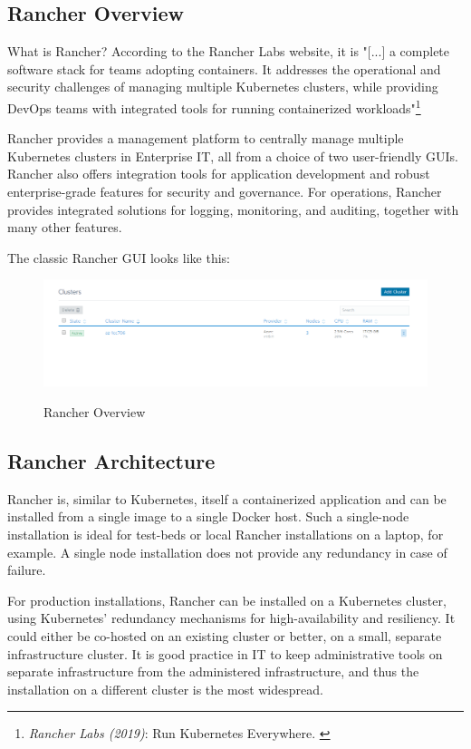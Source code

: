 \subsection{Rancher Overview}

What is Rancher? According to the Rancher Labs website, it is "[...] a complete software stack for teams adopting containers. It addresses the operational and security challenges of managing multiple Kubernetes clusters, while providing DevOps teams with integrated tools for running containerized workloads"\footnote{\textit{Rancher Labs (2019)}: Run Kubernetes Everywhere. \cite{rancher}}

Rancher provides a management platform to centrally manage multiple Kubernetes clusters in Enterprise IT, all from a choice of two user-friendly GUIs. Rancher also offers integration tools for application development and robust enterprise-grade features for security and governance. For operations, Rancher provides integrated solutions for logging, monitoring, and auditing, together with many other features.

The classic Rancher GUI looks like this:

\begin{figure}[H]
\centering
\caption {Rancher Overview}
\includegraphics[width=\linewidth]{images/cluster-overview.png}
\label{fig:rancherOverview}
\end{figure}

\subsection{Rancher Architecture}

Rancher is, similar to Kubernetes, itself a containerized application and can be installed from a single image to a single Docker host. Such a single-node installation is ideal for test-beds or local Rancher installations on a laptop, for example. A single node installation does not provide any redundancy in case of failure.

For production installations, Rancher can be installed on a Kubernetes cluster, using Kubernetes' redundancy mechanisms for high-availability and resiliency. It could either be co-hosted on an existing cluster or better, on a small, separate infrastructure cluster. It is good practice in IT to keep administrative tools on separate infrastructure from the administered infrastructure, and thus the installation on a different cluster is the most widespread.

